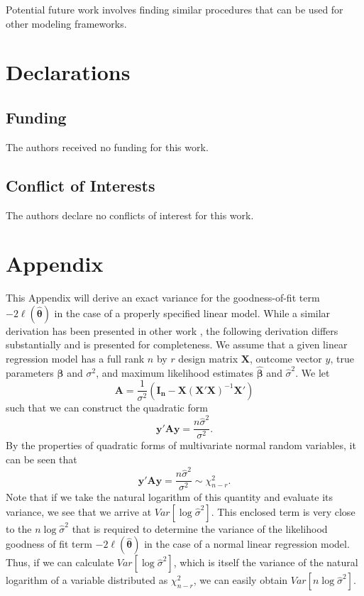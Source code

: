 \documentclass[sn-mathphys-ay]{sn-jnl}
\begin{document}
Potential future work involves finding similar procedures that can be used for other modeling frameworks.

\section*{Declarations}

\subsection*{Funding}

The authors received no funding for this work.

\subsection*{Conflict of Interests}

The authors declare no conflicts of interest for this work.


\section{Appendix}
This Appendix will derive an exact variance for the goodness-of-fit term $-2 \ell (\hat{\bm{\theta}} )$ in the case of a properly specified
linear model. While a similar derivation has been presented in other work \citep{McQuarrie}, the following derivation differs substantially and is presented for completeness.
We assume that a given linear regression model has a full rank $n$ by $r$ design matrix $\bm{X}$, outcome vector $y$, true parameters $\bm{\beta}$ and $\sigma^2$,
and maximum likelihood estimates $\hat{\bm{\beta}}$ and $\hat{\sigma}^2$. We let
\begin{equation*}
	\bm{A} = \frac{1}{\sigma^2} (\bm{I_n} - \bm{X}(\bm{X}'\bm{X})^{-1}\bm{X}') 
\end{equation*}
such that we can construct the quadratic form
\begin{equation*}
	\bm{y'Ay} = \frac{n \hat{\sigma}^2}{\sigma^2} .
\end{equation*}
By the properties of quadratic forms of multivariate normal random variables, it can be seen that
\begin{equation}
	\bm{y'Ay} = \frac{n \hat{\sigma}^2}{\sigma^2} \sim \chi^2_{n-r} .
\end{equation}
Note that if we take the natural logarithm of this quantity and evaluate its variance, we see that we arrive at $Var \left[ \log \hat{\sigma}^2 \right]$. This enclosed term is very close to the $n \log \hat{\sigma}^2$ that is required
to determine the variance of the likelihood goodness of fit term $-2 \ell (\hat{\bm{\theta}} )$ in the case of a normal linear regression model.
Thus, if we can calculate $Var \left[ \log \hat{\sigma}^2 \right]$, which is itself the variance
of the natural logarithm of a variable distributed as $\chi^2_{n-r}$, we can easily obtain $Var \left[ n \log \hat{\sigma}^2 \right]$.
\end{document}
